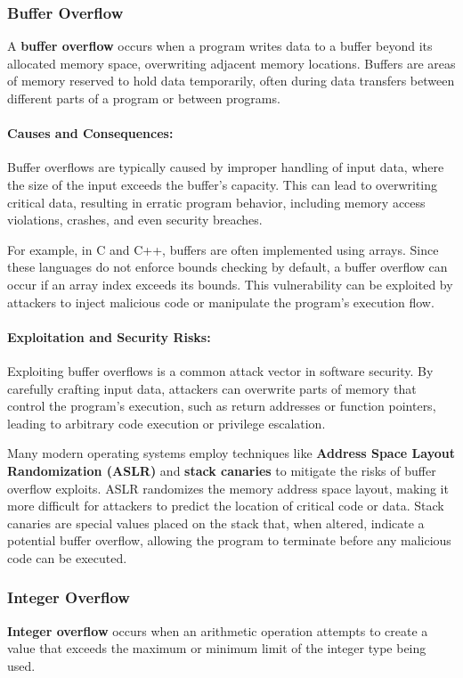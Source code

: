 \documentclass[12pt, oneside]{book}
\begin{document}
\subsubsection{Buffer Overflow}
A \textbf{buffer overflow} occurs when a program writes data to a buffer beyond its allocated memory space, overwriting adjacent memory locations. Buffers are areas of memory reserved to hold data temporarily, often during data transfers between different parts of a program or between programs.

\paragraph{Causes and Consequences:}
Buffer overflows are typically caused by improper handling of input data, where the size of the input exceeds the buffer’s capacity. This can lead to overwriting critical data, resulting in erratic program behavior, including memory access violations, crashes, and even security breaches.

For example, in C and C++, buffers are often implemented using arrays. Since these languages do not enforce bounds checking by default, a buffer overflow can occur if an array index exceeds its bounds. This vulnerability can be exploited by attackers to inject malicious code or manipulate the program’s execution flow.

\paragraph{Exploitation and Security Risks:}
Exploiting buffer overflows is a common attack vector in software security. By carefully crafting input data, attackers can overwrite parts of memory that control the program's execution, such as return addresses or function pointers, leading to arbitrary code execution or privilege escalation.

Many modern operating systems employ techniques like \textbf{Address Space Layout Randomization (ASLR)} and \textbf{stack canaries} to mitigate the risks of buffer overflow exploits. ASLR randomizes the memory address space layout, making it more difficult for attackers to predict the location of critical code or data. Stack canaries are special values placed on the stack that, when altered, indicate a potential buffer overflow, allowing the program to terminate before any malicious code can be executed.

\subsubsection{Integer Overflow}
\textbf{Integer overflow} occurs when an arithmetic operation attempts to create a value that exceeds the maximum or minimum limit of the integer type being used. 
\end{document}
